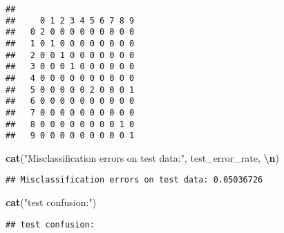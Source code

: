 \documentclass[
]{article}
\newenvironment{Shaded}{\begin{snugshade}}{\end{snugshade}}
\newcommand{\DecValTok}[1]{\textcolor[rgb]{0.00,0.00,0.81}{#1}}
\newcommand{\FunctionTok}[1]{\textcolor[rgb]{0.13,0.29,0.53}{\textbf{#1}}}
\newcommand{\NormalTok}[1]{#1}
\newcommand{\SpecialCharTok}[1]{\textcolor[rgb]{0.81,0.36,0.00}{\textbf{#1}}}
\newcommand{\StringTok}[1]{\textcolor[rgb]{0.31,0.60,0.02}{#1}}
\begin{document}
\begin{Shaded}
\end{Shaded}

\begin{verbatim}
##    
##     0 1 2 3 4 5 6 7 8 9
##   0 2 0 0 0 0 0 0 0 0 0
##   1 0 1 0 0 0 0 0 0 0 0
##   2 0 0 1 0 0 0 0 0 0 0
##   3 0 0 0 1 0 0 0 0 0 0
##   4 0 0 0 0 0 0 0 0 0 0
##   5 0 0 0 0 0 2 0 0 0 1
##   6 0 0 0 0 0 0 0 0 0 0
##   7 0 0 0 0 0 0 0 0 0 0
##   8 0 0 0 0 0 0 0 0 1 0
##   9 0 0 0 0 0 0 0 0 0 1
\end{verbatim}

\begin{Shaded}
\begin{Highlighting}[]
\FunctionTok{cat}\NormalTok{(}\StringTok{"Misclassification errors on test data:"}\NormalTok{, test\_error\_rate, }\StringTok{\textquotesingle{}}\SpecialCharTok{\textbackslash{}n}\StringTok{\textquotesingle{}}\NormalTok{)}
\end{Highlighting}
\end{Shaded}

\begin{verbatim}
## Misclassification errors on test data: 0.05036726
\end{verbatim}

\begin{Shaded}
\begin{Highlighting}[]
\FunctionTok{cat}\NormalTok{(}\StringTok{"test confusion:"}\NormalTok{)}
\end{Highlighting}
\end{Shaded}

\begin{verbatim}
## test confusion:
\end{verbatim}

\begin{Shaded}
\end{Shaded}
\end{document}

